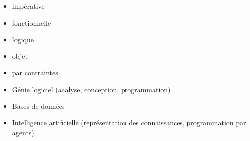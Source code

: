 \begin{itemize}
	\item impérative
	\item fonctionnelle
	\item logique
	\item objet
	\item par contraintes
\end{itemize}

\newpage

\begin{itemize}
	\item Génie logiciel (analyse, conception, programmation)
	\item Bases de données
	\item Intelligence artificielle (représentation des connaissances, programmation par agents)
\end{itemize}
